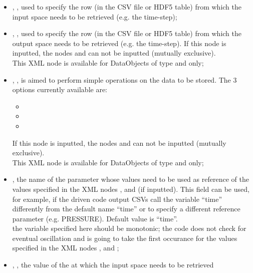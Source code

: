 \begin{itemize}
  \item {}, , used to
       specify  the row (in the CSV file or HDF5 table) from which the input space
      needs to be retrieved (e.g. the time-step);
  \item {}, , used to
       specify  the row (in the CSV file or HDF5 table) from which the output space
      needs to be retrieved (e.g. the time-step). If this node is inputted, the nodes
        and   can not be inputted (mutually exclusive).
     \\\nb This XML node is available for DataObjects of type  and  only;
  \item {}, , is aimed to perform 
       simple operations on the data to be stored.
       The 3 options currently available are:
       \begin{itemize}
          \item {}
          \item {}
          \item {}
       \end{itemize}
       If this node is inputted, the nodes
        and   can not be inputted (mutually exclusive).
       \\\nb This XML node is available for DataObjects of type  and  only;
  \item {},  the name of the parameter whose values
    need to be used as reference of the values specified in the XML nodes  ,   and   (if inputted). This field can be used, for example, if the driven code output CSVs call the variable ``time'' differently 
  from the default name ``time'' or to specify a different reference parameter (e.g. PRESSURE). Default value is ``time''.
   \\\nb the variable specified here should be monotonic; the code does not check for eventual oscillation and is going to take the first occurance for the values specified in the XML nodes ,   and   ;
  \item {}, , the value of the  at which the input space needs to be retrieved

\end{itemize}
